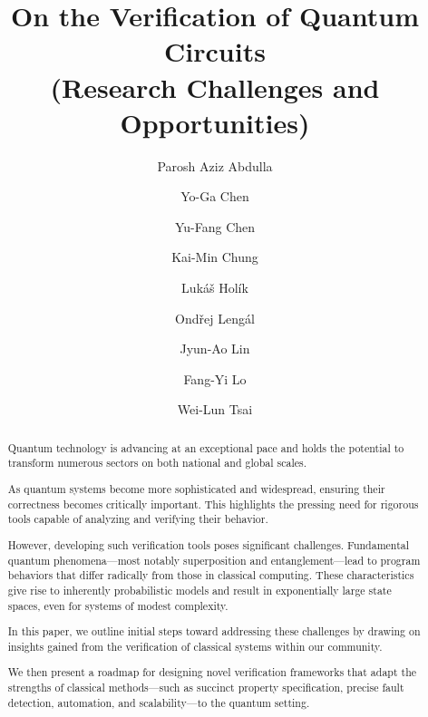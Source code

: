 

\title{On the Verification of Quantum Circuits\\
(Research Challenges and Opportunities) }

\author{
Parosh Aziz Abdulla
\and
Yo-Ga Chen
\and
Yu-Fang Chen
\and
Kai-Min Chung
\and
Luk\'a\v{s} Hol\'ik
\and
{Ond\v{r}ej Leng\'{a}l} 
\and 
Jyun-Ao Lin
\and
Fang-Yi Lo
\and
Wei-Lun Tsai
}

\maketitle
\begin{abstract}
Quantum technology is advancing at an exceptional pace and holds the potential to transform numerous sectors on both national and global scales. 
 
As quantum systems become more sophisticated and widespread, ensuring their correctness becomes critically important. This highlights the pressing need for rigorous tools capable of analyzing and verifying their behavior.
 
However, developing such verification tools poses significant challenges. Fundamental quantum phenomena—most notably superposition and entanglement—lead to program behaviors that differ radically from those in classical computing. These characteristics give rise to inherently probabilistic models and result in exponentially large state spaces, even for systems of modest complexity.
 

In this paper, we outline initial steps toward addressing these challenges by drawing on insights gained from the verification of classical systems within our community.
 
We then present a roadmap for designing novel verification frameworks that adapt the strengths of classical methods—such as succinct property specification, precise fault detection, automation, and scalability—to the quantum setting.
 
\end{abstract}

